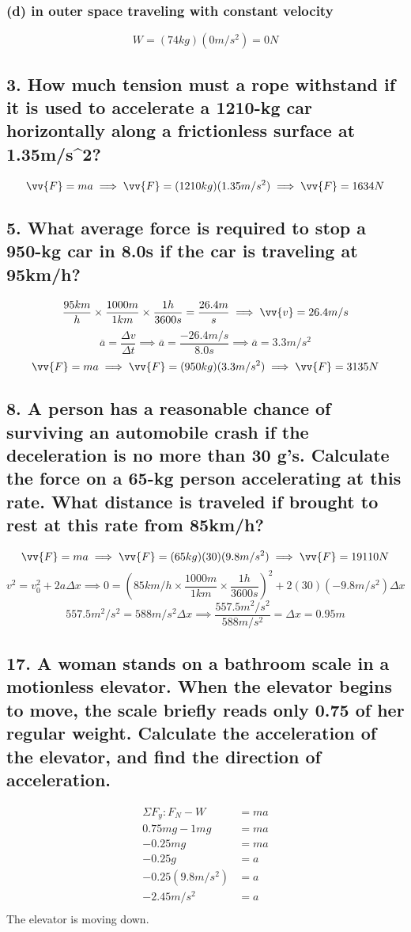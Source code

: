 \documentclass[12pt,a4paper,english]{article}
\begin{document}
\begin{flushleft}
  \subsubsection{(d) in outer space traveling with constant velocity}
  \[
    W=(74kg)(0m/s^2)=0N
  \]
  \subsection{3. How much tension must a rope withstand if it is used to accelerate a 1210-kg car horizontally along a frictionless surface at 1.35m/s^2?}
  \[
    \vv{F}=ma\implies
    \vv{F}=(1210kg)(1.35m/s^2)\implies
    \vv{F}=1634N
  \]
  \subsection{5. What average force is required to stop a 950-kg car in 8.0s if the car is traveling at 95km/h?}
  \[
    \frac{95km}{h}\times\frac{1000m}{1km}\times\frac{1h}{3600s}=
    \frac{26.4m}{s}\implies
    \vv{v}=26.4m/s
  \]
  \[
    \overline{a}=\frac{\Delta v}{\Delta t}\implies
    \overline{a}=\frac{-26.4m/s}{8.0s}\implies
    \overline{a}=3.3m/s^2
  \]
  \[
    \vv{F}=ma\implies
    \vv{F}=(950kg)(3.3m/s^2)\implies
    \vv{F}=3135N
  \]
  \subsection{8. A person has a reasonable chance of surviving an automobile crash if the deceleration is no more than 30 g's. Calculate the force on a 65-kg person accelerating at this rate. What distance is traveled if brought to rest at this rate from 85km/h?}
  \[
    \vv{F}=ma\implies
    \vv{F}=(65kg)(30)(9.8m/s^2)\implies
    \vv{F}=19110N
  \]
  \[
    v^2=v_0^2+2a\Delta x\implies
    0=(85km/h\times\frac{1000m}{1km}\times\frac{1h}{3600s})^2+2(30)(-9.8m/s^2)\Delta x
  \]
  \[
    557.5m^2/s^2=588m/s^2\Delta x\implies
    \frac{557.5m^2/s^2}{588m/s^2}=\Delta x=0.95m
  \]
  \subsection{17. A woman stands on a bathroom scale in a motionless elevator. When the elevator begins to move, the scale briefly reads only 0.75 of her regular weight. Calculate the acceleration of the elevator, and find the direction of acceleration.}
  \begin{equation*}
  \begin{split}
    \Sigma F_y:
     F_N-W&=ma\\
    0.75mg-1mg&=ma\\
    -0.25mg&=ma\\
    -0.25g&=a\\
    -0.25(9.8m/s^2)&=a\\
    -2.45m/s^2&=a\\
  \end{split}
  \end{equation*}
    The elevator is moving down.

\end{flushleft}
\end{document}
